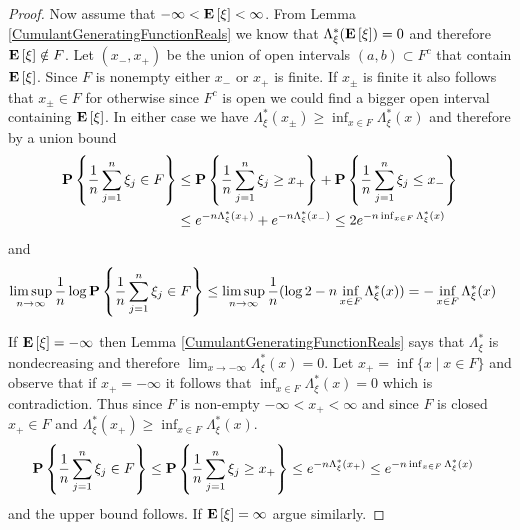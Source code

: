 \begin{proof}
Now assume that $-\infty < \textbf{E}\left[\xi\right] < \infty$.  From Lemma \ref{CumulantGeneratingFunctionReals} we know that $\Lambda_\xi^*(\textbf{E}\left[\xi\right]) = 0$ and therefore $\textbf{E}\left[\xi\right] \notin F$.  Let $(x_-,x_+)$ be the union of open intervals $(a,b) \subset F^c$ that contain $\textbf{E}\left[\xi\right]$.  Since $F$ is nonempty either $x_-$ or $x_+$ is finite.  If $x_\pm$ is finite it also follows that $x_\pm \in F$ for otherwise since $F^c$ is open we could find a bigger open interval containing $\textbf{E}\left[\xi\right]$.  In either case we have
$\Lambda_\xi^*(x_\pm) \geq \inf_{x \in F} \Lambda_\xi^*(x)$ and therefore by a union bound
\begin{align*}
\textbf{P}\left \{\frac{1}{n} \sum_{j=1}^n \xi_j \in F \right \} &\leq \textbf{P}\left \{\frac{1}{n} \sum_{j=1}^n \xi_j \geq x_+ \right \} + \textbf{P}\left \{\frac{1}{n} \sum_{j=1}^n \xi_j \leq x_- \right \}  \\
&\leq e^{-n \Lambda_\xi^*(x_+)} + e^{-n \Lambda_\xi^*(x_-)} \leq 2 e^{-n \inf_{x \in F} \Lambda_\xi^*(x)}
\end{align*}
and 
\begin{align*}
\limsup_{n \to \infty} \frac{1}{n} \log \textbf{P}\left \{\frac{1}{n} \sum_{j=1}^n \xi_j \in F \right \} &\leq \limsup_{n \to \infty} \frac{1}{n} (\log 2 - n \inf_{x \in F} \Lambda_\xi^*(x)) = 
- \inf_{x \in F} \Lambda_\xi^*(x)
\end{align*}

If $\textbf{E}\left[\xi\right] = -\infty$ then Lemma \ref{CumulantGeneratingFunctionReals} says that $\Lambda_\xi^*$ is nondecreasing and therefore $\lim_{x \to -\infty} \Lambda_\xi^*(x) = 0$.  Let $x_+ = \inf \lbrace x \mid x \in F \rbrace$ and observe that if $x_+ = -\infty$ it follows that $\inf_{x \in F} \Lambda_\xi^*(x) = 0$ which is contradiction.  Thus since $F$ is non-empty $-\infty < x_+ < \infty$ and since $F$ is closed $x_+ \in F$ and $\Lambda_\xi^*(x_+) \geq \inf_{x \in F} \Lambda_\xi^*(x)$.  
\begin{align*}
\textbf{P}\left \{\frac{1}{n} \sum_{j=1}^n \xi_j \in F \right \} &\leq \textbf{P}\left \{\frac{1}{n} \sum_{j=1}^n \xi_j \geq x_+ \right \} \leq e^{-n \Lambda_\xi^*(x_+)} \leq e^{-n \inf_{x \in F} \Lambda_\xi^*(x)}
\end{align*}
and the upper bound follows.  If $\textbf{E}\left[\xi\right] = \infty$ argue similarly.


\end{proof}

